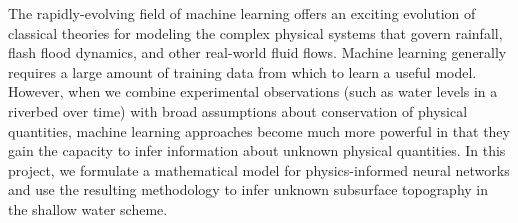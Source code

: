 The rapidly-evolving field of machine learning offers an exciting evolution of classical theories for 
modeling the complex physical systems that govern rainfall, flash flood dynamics, and other real-world fluid flows. 
Machine learning generally requires a large amount of training data from which to learn a useful model. However, 
when we combine experimental observations (such as water levels in a riverbed over time) with broad assumptions
about conservation of physical quantities, machine learning approaches become much more powerful in that they gain 
the capacity to infer information about unknown physical quantities. In this project, we formulate a mathematical
model for physics-informed neural networks and use the resulting methodology to infer unknown subsurface topography 
in the shallow water scheme.